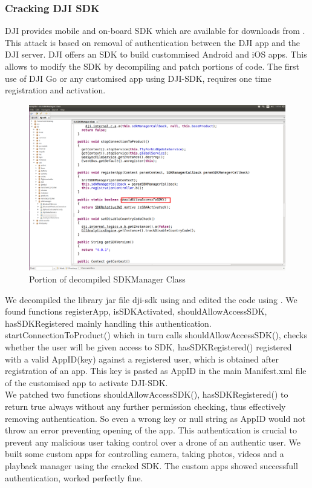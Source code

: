 \documentclass[conference]{IEEEtran}
\begin{document}
\subsubsection{Cracking DJI SDK}
DJI provides mobile and on-board SDK which are available for downloads from \cite{djisdk}.
This attack is based on removal of authentication between the DJI app and the DJI server. DJI offers an SDK to build custommised Android and iOS apps. This allows to modify the SDK by decompiling and patch portions of code. The first use of DJI Go or any customised app using DJI-SDK, requires one time registration and activation. 
\begin{figure}[h!]
	\centering
	\includegraphics[width=0.9\columnwidth]{jd}
	\caption{Portion of decompiled SDKManager Class}
\end{figure} 
We decompiled the library jar file dji-sdk using \cite{jdgui} and edited the code using \cite{jbe}. We found functions registerApp, isSDKActivated,  shouldAllowAccessSDK, hasSDKRegistered mainly handling this authentication. startConnectionToProduct() which in turn calls shouldAllowAccessSDK(), checks whether the user will be given access to SDK, hasSDKRegistered() registered with a valid AppID(key) against a registered user, which is obtained after registration of an app. This key is pasted as AppID in the main Manifest.xml file of the customised app to activate DJI-SDK.\\
We patched two functions shouldAllowAccessSDK(), hasSDKRegistered() to return true always without any further permission checking, thus effectively removing authentication. So even a wrong key or null string as AppID would not throw an error preventing opening of the app. This authentication is crucial to prevent any malicious user taking control over a drone of an authentic user. We built some custom apps for controlling camera, taking photos, videos and a playback manager using the cracked SDK. The custom apps showed successfull authentication, worked perfectly fine.
\end{document}
